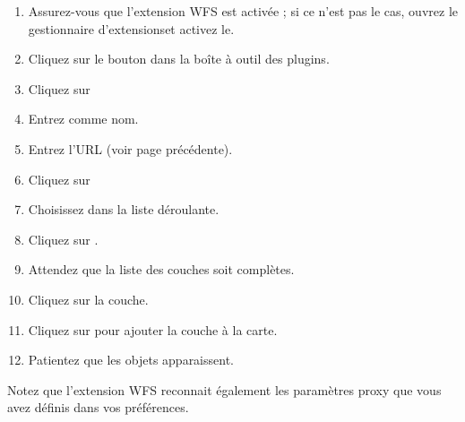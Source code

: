 \begin{enumerate}
  \item Assurez-vous que l'extension WFS est activée ; si ce n'est pas le cas,
ouvrez le gestionnaire d'extensionset activez le.
  \item Cliquez sur le bouton  dans la boîte à outil des plugins.
  \item Cliquez sur  
  \item Entrez  comme nom.
\item Entrez l'URL (voir page précédente).
\item Cliquez sur 
  \item Choisissez  dans la
liste déroulante.
\item Cliquez sur .
\item Attendez que la liste des couches soit complètes.
\item Cliquez sur la couche.
\item Cliquez sur  pour ajouter la couche à la carte.
\item Patientez que les objets apparaissent.
\end{enumerate}

Notez que l'extension WFS reconnait également les paramètres proxy que vous avez définis dans vos préférences.

